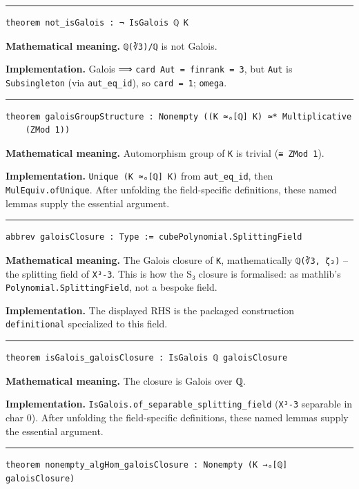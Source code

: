 \documentclass[UTF8,a4paper,11pt,fontset=fandol]{ctexart}
\theoremstyle{definition}
\newcommand{\statementsep}{\par\medskip\hrule\medskip}
\begin{document}
\statementsep
\begin{verbatim}
theorem not_isGalois : ¬ IsGalois ℚ K
\end{verbatim}
\noindent\textbf{Mathematical meaning.} \texttt{ℚ(∛3)/\allowbreak{}ℚ} is not Galois.\par
\noindent\textbf{Implementation.} Galois ⟹ \texttt{card Aut = finrank = 3}, but \texttt{Aut} is \texttt{Subsingleton} (via \texttt{aut\_\allowbreak{}eq\_\allowbreak{}id}), so \texttt{card = 1}; \texttt{omega}.\par
\statementsep
\begin{verbatim}
theorem galoisGroupStructure : Nonempty ((K ≃ₐ[ℚ] K) ≃* Multiplicative
    (ZMod 1))
\end{verbatim}
\noindent\textbf{Mathematical meaning.} Automorphism group of \texttt{K} is trivial (\texttt{≅ ZMod 1}).\par
\noindent\textbf{Implementation.} \texttt{Unique (K ≃ₐ[ℚ] K)} from \texttt{aut\_\allowbreak{}eq\_\allowbreak{}id}, then \texttt{MulEquiv.\allowbreak{}ofUnique}. After unfolding the field-specific definitions, these named lemmas supply the essential argument.\par
\statementsep
\begin{verbatim}
abbrev galoisClosure : Type := cubePolynomial.SplittingField
\end{verbatim}
\noindent\textbf{Mathematical meaning.} The Galois closure of \texttt{K}, mathematically \texttt{ℚ(∛3, ζ₃)} -- the splitting field of \texttt{X³-3}. This is how the S₃ closure is formalised: as mathlib's \texttt{Polynomial.\allowbreak{}SplittingField}, not a bespoke field.\par
\noindent\textbf{Implementation.} The displayed RHS is the packaged construction \texttt{definitional} specialized to this field.\par
\statementsep
\begin{verbatim}
theorem isGalois_galoisClosure : IsGalois ℚ galoisClosure
\end{verbatim}
\noindent\textbf{Mathematical meaning.} The closure is Galois over ℚ.\par
\noindent\textbf{Implementation.} \texttt{IsGalois.\allowbreak{}of\_\allowbreak{}separable\_\allowbreak{}splitting\_\allowbreak{}field} (\texttt{X³-3} separable in char 0). After unfolding the field-specific definitions, these named lemmas supply the essential argument.\par
\statementsep
\begin{verbatim}
theorem nonempty_algHom_galoisClosure : Nonempty (K →ₐ[ℚ] galoisClosure)
\end{verbatim}
\end{document}
